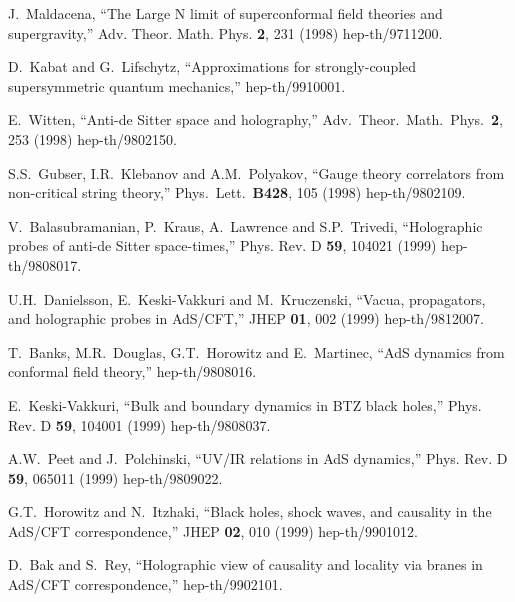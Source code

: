 \documentclass[a4paper,12pt]{article}
\begin{document}
\begin{thebibliography}{10} 


J.~Maldacena, 
``The Large N limit of superconformal 
field theories and supergravity,'' 
Adv. Theor. Math. Phys. {\bf 2}, 231 (1998) 
hep-th/9711200. 

D.~Kabat and G.~Lifschytz,
``Approximations for strongly-coupled supersymmetric quantum mechanics,''
hep-th/9910001.

E.~Witten,
``Anti-de Sitter space and holography,''
Adv.\ Theor.\ Math.\ Phys.\ {\bf 2}, 253 (1998)
hep-th/9802150.

S.S.~Gubser, I.R.~Klebanov and A.M.~Polyakov,
``Gauge theory correlators from non-critical string theory,''
Phys.\ Lett.\ {\bf B428}, 105 (1998)
hep-th/9802109.

V.~Balasubramanian, P.~Kraus, A.~Lawrence and S.P.~Trivedi, 
``Holographic probes of anti-de Sitter space-times,'' 
Phys. Rev. D {\bf 59}, 104021 (1999) 
hep-th/9808017. 
 
U.H.~Danielsson, E.~Keski-Vakkuri and M.~Kruczenski, 
``Vacua, propagators, and holographic probes in AdS/CFT,'' 
JHEP {\bf 01}, 002 (1999) 
hep-th/9812007. 
 
T.~Banks, M.R.~Douglas, G.T.~Horowitz and E.~Martinec, 
``AdS dynamics from conformal field theory,'' 
hep-th/9808016. 
 
E.~Keski-Vakkuri, 
``Bulk and boundary dynamics in BTZ black holes,'' 
Phys. Rev. D {\bf 59}, 104001 (1999) 
hep-th/9808037. 
 
A.W.~Peet and J.~Polchinski, 
``UV/IR relations in AdS dynamics,''
Phys. Rev. D {\bf 59}, 065011 (1999) 
hep-th/9809022. 
 
G.T.~Horowitz and N.~Itzhaki, 
``Black holes, shock waves, and causality in the AdS/CFT correspondence,'' 
JHEP {\bf 02}, 010 (1999) 
hep-th/9901012. 
 
D.~Bak and S.~Rey, 
``Holographic view of causality and locality via branes in AdS/CFT 
correspondence,'' 
hep-th/9902101. 
 

\end{thebibliography}
\end{document}
